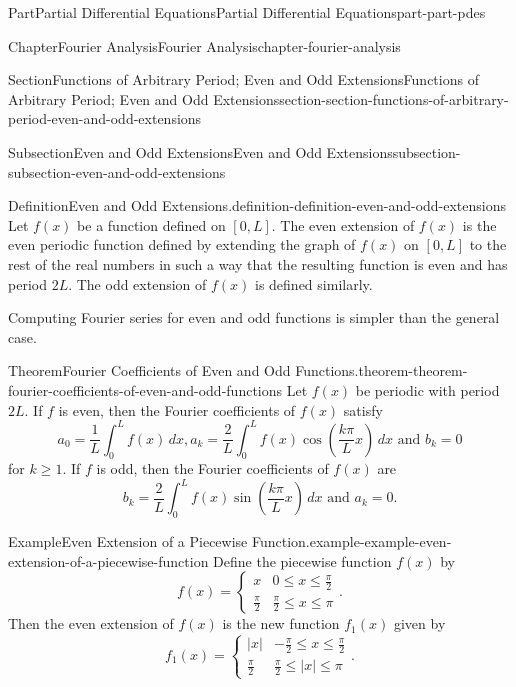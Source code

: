 \documentclass[twoside,10pt,]{book}
\numberwithin{equation}{part}
\newcommand{\amp}{&}
\begin{document}
\begin{partptx}{Part}{Partial Differential Equations}{}{Partial Differential Equations}{}{}{part-part-pdes}
\begin{chapterptx}{Chapter}{Fourier Analysis}{}{Fourier Analysis}{}{}{chapter-fourier-analysis}
\begin{sectionptx}{Section}{Functions of Arbitrary Period; Even and Odd Extensions}{}{Functions of Arbitrary Period; Even and Odd Extensions}{}{}{section-section-functions-of-arbitrary-period-even-and-odd-extensions}
\begin{subsectionptx}{Subsection}{Even and Odd Extensions}{}{Even and Odd Extensions}{}{}{subsection-subsection-even-and-odd-extensions}
\begin{definition}{Definition}{Even and Odd Extensions.}{definition-definition-even-and-odd-extensions}
%
Let \(f(x)\) be a function defined on \([0,L]\). The even extension of \(f(x)\) is the even periodic function defined by extending the graph of \(f(x)\) on \([0,L]\) to the rest of the real numbers in such a way that the resulting function is even and has period \(2L\). The odd extension of \(f(x)\) is defined similarly.%
\end{definition}
Computing Fourier series for even and odd functions is simpler than the general case.%
\begin{theorem}{Theorem}{Fourier Coefficients of Even and Odd Functions.}{}{theorem-theorem-fourier-coefficients-of-even-and-odd-functions}%
%
Let \(f(x)\) be periodic with period \(2L\). If \(f\) is even, then the Fourier coefficients of \(f(x)\) satisfy%
\begin{equation*}
a_{0} = \frac{1}{L}\int_{0}^{L}f(x)\,dx, a_{k} = \frac{2}{L}\int_{0}^{L}f(x)\cos\left(\frac{k\pi}{L}x\right)\,dx\text{ and } b_{k} = 0
\end{equation*}
for \(k\geq1\). If \(f\) is odd, then the Fourier coefficients of \(f(x)\) are%
\begin{equation*}
b_{k} = \frac{2}{L}\int_{0}^{L}f(x)\sin\left(\frac{k\pi}{L}x\right)\,dx\text{ and } a_{k} = 0.
\end{equation*}
%
\end{theorem}
\begin{example}{Example}{Even Extension of a Piecewise Function.}{example-example-even-extension-of-a-piecewise-function}%
Define the piecewise function \(f(x)\) by%
\begin{equation*}
f(x) = \begin{cases}x \amp 0\leq x\leq \frac{\pi}{2} \\ \frac{\pi}{2} \amp \frac{\pi}{2}\leq x\leq \pi\end{cases}.
\end{equation*}
Then the even extension of \(f(x)\) is the new function \(f_{1}(x)\) given by%
\begin{equation*}
f_{1}(x) = \begin{cases}|x| \amp -\frac{\pi}{2}\leq x\leq \frac{\pi}{2} \\ \frac{\pi}{2} \amp \frac{\pi}{2}\leq |x|\leq \pi\end{cases}.
\end{equation*}

\end{example}
\end{subsectionptx}
\end{sectionptx}
\end{chapterptx}
\end{partptx}
\end{document}
